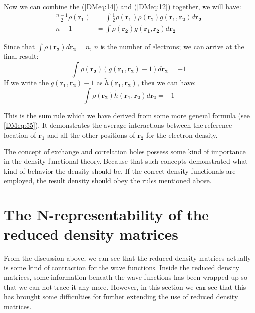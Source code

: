 Now we can combine the (\ref{DMeq:14}) and (\ref{DMeq:12}) together,
we will have:
\begin{align}
  \frac{n-1}{2}\rho(\bm{r_{1}}) &= \int
  \frac{1}{2}\rho(\bm{r_{1}})\rho(\bm{r_{2}})g(\bm{r_{1}}, \bm{r_{2}})
  d\bm{r_{2}}  \nonumber \\
  n-1 &= \int \rho(\bm{r_{2}})g(\bm{r_{1}}, \bm{r_{2}}) d\bm{r_{2}}
\end{align}

Since that $\int \rho(\bm{r_{2}})d\bm{r_{2}} = n$, $n$ is the number
of electrons; we can arrive at the final result:
\begin{equation}
  \label{DMeq:15}
  \int\rho(\bm{r_{2}})(g(\bm{r_{1}}, \bm{r_{2}}) - 1) d\bm{r_{2}} = -1
\end{equation}
If we write the $g(\bm{r_{1}}, \bm{r_{2}}) - 1$ as 
$\widetilde{h}(\bm{r_{1}}, \bm{r_{2}})$, then we can have:
\begin{equation}
   \label{DM_xc_hole_sum_rule}
  \int\rho(\bm{r_{2}})\widetilde{h}(\bm{r_{1}}, \bm{r_{2}})
 d\bm{r_{2}} = -1
\end{equation}

This is the sum rule which we have derived from some more general
formula (see \ref{DMeq:55}). It demonstrates the average interactions
between the reference location of $\bm{r_{1}}$ and all the other
positions of $\bm{r_{2}}$ for the electron density.

The concept of exchange and correlation holes possess some kind of
importance in the density functional theory. Because that such
concepts demonstrated what kind of behavior the density should be. If
the correct density functionals are employed, the result density
should obey the rules mentioned above.

\section{The N-representability of the reduced density matrices}
%
%
%
From the discussion above, we can see that the reduced density
matrices actually is some kind of contraction for the wave
functions. Inside the reduced density matrices, some information
beneath the wave functions has been wrapped up so that we can not
trace it any more. However, in this section we can see that this has
brought some difficulties for further extending the use of reduced
density matrices.


